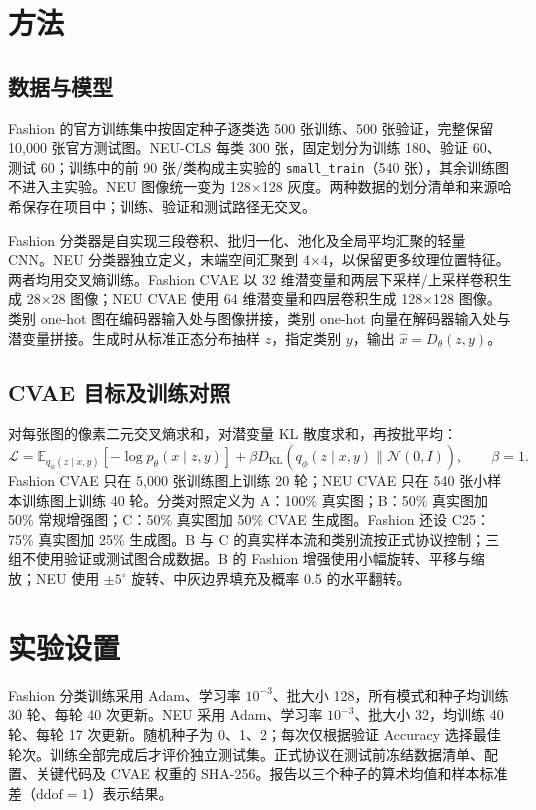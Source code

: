 \documentclass{article}
\begin{document}
\section{方法}
\subsection{数据与模型}
Fashion 的官方训练集中按固定种子逐类选 500 张训练、500 张验证，完整保留 10,000 张官方测试图。NEU-CLS 每类 300 张，固定划分为训练 180、验证 60、测试 60；训练中的前 90 张/类构成主实验的 \texttt{small\_train}（540 张），其余训练图不进入主实验。NEU 图像统一变为 128$\times$128 灰度。两种数据的划分清单和来源哈希保存在项目中；训练、验证和测试路径无交叉。

Fashion 分类器是自实现三段卷积、批归一化、池化及全局平均汇聚的轻量 CNN。NEU 分类器独立定义，末端空间汇聚到 4$\times$4，以保留更多纹理位置特征。两者均用交叉熵训练。Fashion CVAE 以 32 维潜变量和两层下采样/上采样卷积生成 28$\times$28 图像；NEU CVAE 使用 64 维潜变量和四层卷积生成 128$\times$128 图像。类别 one-hot 图在编码器输入处与图像拼接，类别 one-hot 向量在解码器输入处与潜变量拼接。生成时从标准正态分布抽样 $z$，指定类别 $y$，输出 $\hat{x}=D_\theta(z,y)$。

\subsection{CVAE 目标及训练对照}
对每张图的像素二元交叉熵求和，对潜变量 KL 散度求和，再按批平均：
\begin{equation}
\mathcal{L}=\mathbb{E}_{q_\phi(z\mid x,y)}[-\log p_\theta(x\mid z,y)]
+\beta D_{\mathrm{KL}}\!\left(q_\phi(z\mid x,y)\|\mathcal{N}(0,I)\right),\qquad \beta=1.
\end{equation}
Fashion CVAE 只在 5,000 张训练图上训练 20 轮；NEU CVAE 只在 540 张小样本训练图上训练 40 轮。分类对照定义为 A：100\% 真实图；B：50\% 真实图加 50\% 常规增强图；C：50\% 真实图加 50\% CVAE 生成图。Fashion 还设 C25：75\% 真实图加 25\% 生成图。B 与 C 的真实样本流和类别流按正式协议控制；三组不使用验证或测试图合成数据。B 的 Fashion 增强使用小幅旋转、平移与缩放；NEU 使用 $\pm5^\circ$ 旋转、中灰边界填充及概率 0.5 的水平翻转。

\section{实验设置}
Fashion 分类训练采用 Adam、学习率 $10^{-3}$、批大小 128，所有模式和种子均训练 30 轮、每轮 40 次更新。NEU 采用 Adam、学习率 $10^{-3}$、批大小 32，均训练 40 轮、每轮 17 次更新。随机种子为 0、1、2；每次仅根据验证 Accuracy 选择最佳轮次。训练全部完成后才评价独立测试集。正式协议在测试前冻结数据清单、配置、关键代码及 CVAE 权重的 SHA-256。报告以三个种子的算术均值和样本标准差（$\mathrm{ddof}=1$）表示结果。
\end{document}
